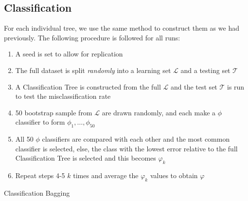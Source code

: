 \documentclass[11pt,a4paper]{report}
\begin{document}
\subsection{Classification}
For each individual tree, we use the same method to construct them as we had previously.
The following procedure is followed for all runs:
\begin{algorithm}
\begin{enumerate}
    \item A seed is set to allow for replication
    
    \item The full dataset is split \textit{randomly} into a learning set $\mathcal{L}$ and a testing set $\mathcal{T}$
    
    \item A Classification Tree is constructed from the full $\mathcal{L}$ and the test set $\mathcal{T}$ is run to test the misclassification rate
    
    \item 50 bootstrap sample from $\mathcal{L}$ are drawn randomly, and each make a $\phi$ classifier to form $\phi_1, \dots, \phi_{50}$
    
    \item All 50 $\phi$ classifiers are compared with each other and the most common classifier is selected, else, the class with the lowest error relative to the full Classification Tree is selected and this becomes $\varphi_k$
    
    \item Repeat steps 4-5 $k$ times and average the $\varphi_k$ values to obtain $\varphi$
\end{enumerate}
\caption{Classification Bagging}
\end{algorithm}
\end{document}
